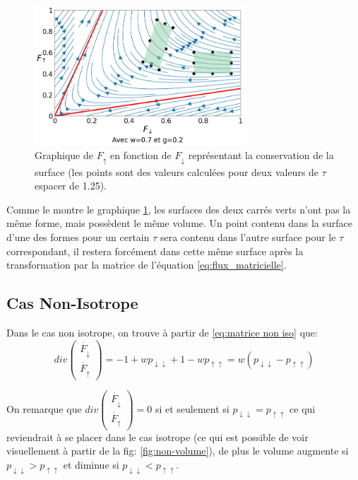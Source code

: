 \documentclass[12pt]{article}
\begin{document}
    
\begin{figure}[H]
    \centering
    \includegraphics[width=0.7\textwidth]{Graphe/Figure Conservation du volume.png}
    \caption{Graphique de $F_{\uparrow}$ en fonction de $F_{\downarrow}$ représentant la conservation de la surface (les points sont des valeurs calculées pour deux valeurs de $\tau$ espacer de 1.25).}
    \label{fig:volume}
\end{figure}    

Comme le montre le graphique \ref{fig:volume}, les surfaces des deux carrés verts n'ont pas la même forme, mais possèdent le même volume. Un point contenu dans la surface d'une des formes pour un certain $\tau$ sera contenu dans l'autre surface pour le $\tau$ correspondant, il restera forcément dans cette même surface après la transformation par la matrice de l'équation \ref{eq:flux_matricielle}.
\subsection{Cas Non-Isotrope}
Dans le cas non isotrope, on trouve à partir de \ref{eq:matrice non iso} que: 
\begin{equation}
    div\begin{pmatrix}
        \dot{F_{\downarrow}} \\
        \dot{F_{\uparrow}}
    \end{pmatrix}=-1+wp_{{\downarrow}{\downarrow}} +1-wp_{{\uparrow}{\uparrow}} = w(p_{\downarrow\downarrow}-p_{\uparrow\uparrow})
\end{equation}\par
On remarque que $div\begin{pmatrix}\dot{F_{\downarrow}} \\ \dot{F_{\uparrow}}\end{pmatrix}=0$ si et seulement si $p_{{\downarrow}{\downarrow}}=p_{{\uparrow}{\uparrow}}$ ce qui reviendrait à se placer dans le cas isotrope (ce qui est possible de voir visuellement à partir de la fig: \ref{fig:non-volume}), de plus le volume augmente si $p_{\downarrow\downarrow}>p_{\uparrow\uparrow}$ et diminue si $p_{\downarrow\downarrow}<p_{\uparrow\uparrow}$. 
\end{document}
